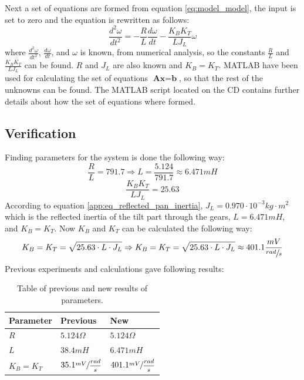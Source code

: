 Next a set of equations are formed from equation \ref{eq:model_model}, the input is set to zero and the equation is rewritten as follows:
\begin{equation}
	\frac{d^{2}\omega}{dt^{2}} = - \frac{R}{L} \frac{d\omega}{dt} - \frac{K_B K_T}{L J_L} \omega
\end{equation}
where $\frac{d^{2}\omega}{dt^{2}}$, $\frac{d\omega}{dt}$, and $\omega$ is known, from numerical analysis, so the constants $\frac{R}{L}$ and $\frac{K_B K_T}{L J_L}$ can be found. $R$ and $J_L$ are also known and $K_B = K_T$. MATLAB have been used for calculating the set of equations $\textbf{Ax} = \textbf{b}$, so that the rest of the unknowns can be found. The MATLAB script located on the CD contains further details about how the set of equations where formed.

\subsection{Verification}
Finding parameters for the system is done the following way:
\begin{equation}
	\frac{R}{L} = 791.7 \Rightarrow L = \frac{5.124}{791.7} \approx 6.471mH
\end{equation}
\begin{equation}
	\frac{K_B K_T}{L J_L} = 25.63\label{eq:constants}
\end{equation}
According to equation \ref{app:eq_reflected_pan_inertia}, $J_L = 0.970 \cdot 10^{-3} kg \cdot m^{2}$ which is the reflected inertia of the tilt part through the gears, $L = 6.471mH$, and $K_B = K_T$. Now $K_B$ and $K_T$ can be calculated the following way:
\begin{equation}
	K_B = K_T = \sqrt{25.63 \cdot L \cdot J_L} \Rightarrow K_B = K_T = \sqrt{25.63 \cdot L \cdot J_L} \approx 401.1 \frac{mV}{\sfrac{rad}{s}}
\end{equation}
Previous experiments\cite{DCMOTOR} and calculations gave following results:
\begin{table}[htb]				
	\centering
	\begin{tabular}{lll}			
Parameter & Previous & New \\			
	\midrule												
$R$ & $5.124\Omega$ & $5.124\Omega$\\
$L$ & $38.4mH$ & $6.471mH$\\
$K_B = K_T$ & $35.1\sfrac{mV}{\dfrac{rad}{s}}$ & $401.1\sfrac{mV}{\dfrac{rad}{s}}$\\
	\end{tabular}
	\caption{Table of previous and new results of parameters.}				
	\label{tab:newparameters}			
\end{table}

